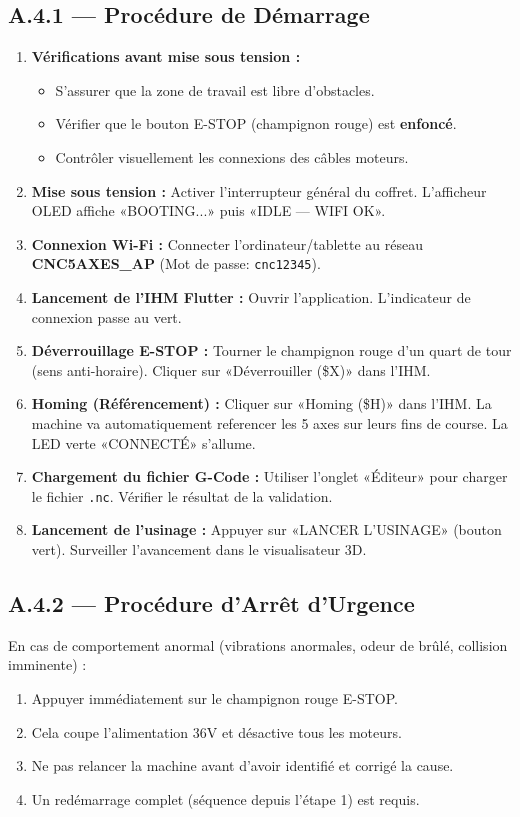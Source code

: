 \subsection{A.4.1 — Procédure de Démarrage}
\begin{enumerate}
    \item \textbf{Vérifications avant mise sous tension :}
    \begin{itemize}
        \item S'assurer que la zone de travail est libre d'obstacles.
        \item Vérifier que le bouton E-STOP (champignon rouge) est \textbf{enfoncé}.
        \item Contrôler visuellement les connexions des câbles moteurs.
    \end{itemize}
    \item \textbf{Mise sous tension :} Activer l'interrupteur général du coffret. L'afficheur OLED affiche «BOOTING...» puis «IDLE — WIFI OK».
    \item \textbf{Connexion Wi-Fi :} Connecter l'ordinateur/tablette au réseau \textbf{CNC5AXES\_AP} (Mot de passe: \texttt{cnc12345}).
    \item \textbf{Lancement de l'IHM Flutter :} Ouvrir l'application. L'indicateur de connexion passe au vert.
    \item \textbf{Déverrouillage E-STOP :} Tourner le champignon rouge d'un quart de tour (sens anti-horaire). Cliquer sur «Déverrouiller (\$X)» dans l'IHM.
    \item \textbf{Homing (Référencement) :} Cliquer sur «Homing (\$H)» dans l'IHM. La machine va automatiquement referencer les 5 axes sur leurs fins de course. La LED verte «CONNECTÉ» s'allume.
    \item \textbf{Chargement du fichier G-Code :} Utiliser l'onglet «Éditeur» pour charger le fichier \texttt{.nc}. Vérifier le résultat de la validation.
    \item \textbf{Lancement de l'usinage :} Appuyer sur «LANCER L'USINAGE» (bouton vert). Surveiller l'avancement dans le visualisateur 3D.
\end{enumerate}

\subsection{A.4.2 — Procédure d'Arrêt d'Urgence}
En cas de comportement anormal (vibrations anormales, odeur de brûlé, collision imminente) :
\begin{enumerate}
    \item Appuyer immédiatement sur le champignon rouge E-STOP.
    \item Cela coupe l'alimentation 36V et désactive tous les moteurs.
    \item Ne pas relancer la machine avant d'avoir identifié et corrigé la cause.
    \item Un redémarrage complet (séquence depuis l'étape 1) est requis.
\end{enumerate}

